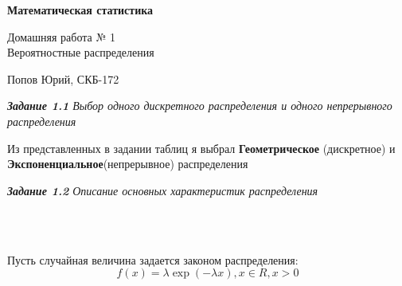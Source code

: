 \documentclass[a4paper,12pt, oneside]{book}
\begin{document}
\pagestyle{plain}

\begin{titlepage}	
	\begin{center}
		{\Huge \textbf{Математическая статистика}}
		\vspace{\baselineskip}
		
		{\huge Домашняя работа № 1 \\}
		\vspace{\baselineskip}
		{\huge Вероятностные распределения}
		\vspace{\baselineskip}
		
		{\large Попов Юрий, СКБ-172}
	\end{center}
\end{titlepage}



\begin{spacing}{0.99}          
	\tableofcontents %
\end{spacing}

\newpage



\vspace{13mm}%
\textit{\textbf{Задание 1.1} Выбор одного дискретного распределения
	и одного непрерывного распределения}



\vspace{13mm}




Из представленных в задании таблиц я выбрал \textbf{Геометрическое} (дискретное) и \textbf{Экспоненциальное}(непрерывное) распределения

\vspace{\baselineskip}
\newpage
\vspace{13mm}%
\textit{\textbf{Задание 1.2} Описание основных характеристик распределения}
\\

\\
\vspace{5mm}

	Пусть случайная величина задается законом распределения:
	$$
	f(x) = \lambda \exp(-\lambda x), x \in R, x > 0
	$$
	
\end{document}

